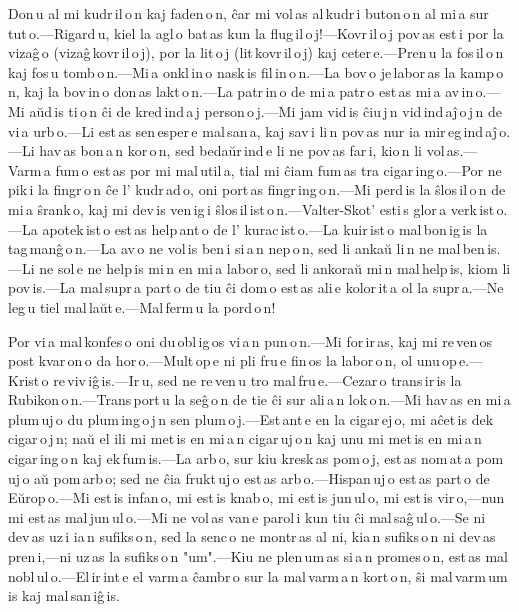 \documentclass[ngerman,12pt,twoside]{book}
\begin{document}

Don\,u al mi kudr\,il\,o\,n kaj faden\,o\,n, ĉar mi vol\,as al\,kudr\,i buton\,o\,n al mi\,a sur\,tut\,o.---Rigard\,u, kiel la agl\,o bat\,as kun la flug\,il\,o\,j!---Kovr\,il\,o\,j pov\,as est\,i por la vizaĝ\,o (vizaĝ\,kovr\,il\,o\,j), por la lit\,o\,j (lit\,kovr\,il\,o\,j) kaj ceter\,e.---Pren\,u la fos\,il\,o\,n kaj fos\,u tomb\,o\,n.---Mi\,a onkl\,in\,o nask\,is fil\,in\,o\,n.---La bov\,o je\,labor\,as la kamp\,o\,n, kaj la bov\,in\,o don\,as lakt\,o\,n.---La patr\,in\,o de mi\,a patr\,o est\,as mi\,a av\,in\,o.---Mi aŭd\,is ti\,o\,n ĉi de kred\,ind\,a\,j person\,o\,j.---Mi jam vid\,is ĉiu\,j\,n vid\,ind\,aĵ\,o\,j\,n de vi\,a urb\,o.---Li est\,as sen\,esper\,e mal\,san\,a, kaj sav\,i li\,n pov\,as nur ia mir\,eg\,ind\,aĵ\,o.---Li hav\,as bon\,a\,n kor\,o\,n, sed bedaŭr\,ind\,e li ne pov\,as far\,i, kio\,n li vol\,as.---Varm\,a fum\,o est\,as por mi mal\,util\,a, tial mi ĉiam fum\,as tra cigar\,ing\,o.---Por ne pik\,i la fingr\,o\,n ĉe l' kudr\,ad\,o, oni port\,as fingr\,ing\,o\,n.---Mi perd\,is la ŝlos\,il\,o\,n de mi\,a ŝrank\,o, kaj mi dev\,is ven\,ig\,i ŝlos\,il\,ist\,o\,n.---Valter-Skot' esti\,s glor\,a verk\,ist\,o.---La apotek\,ist\,o est\,as help\,ant\,o de l' kurac\,ist\,o.---La kuir\,ist\,o mal\,bon\,ig\,is la tag\,manĝ\,o\,n.---La av\,o ne vol\,is ben\,i si\,a\,n nep\,o\,n, sed li ankaŭ li\,n ne mal\,ben\,is.---Li ne sol\,e ne help\,is mi\,n en mi\,a labor\,o, sed li ankoraŭ mi\,n mal\,help\,is, kiom li pov\,is.---La mal\,supr\,a part\,o de tiu ĉi dom\,o est\,as ali\,e kolor\,it\,a ol la supr\,a.---Ne leg\,u tiel mal\,laŭt\,e.---Mal\,ferm\,u la pord\,o\,n! 



Por vi\,a mal\,konfes\,o oni du\,obl\,ig\,os vi\,a\,n pun\,o\,n.---Mi for\,ir\,as, kaj mi re\,ven\,os post kvar\,on\,o da hor\,o.---Mult\,op\,e ni pli fru\,e fin\,os la labor\,o\,n, ol unu\,op\,e.---Krist\,o re\,viv\,iĝ\,is.---Ir\,u, sed ne re\,ven\,u tro mal\,fru\,e.---Cezar\,o trans\,ir\,is la Rubikon\,o\,n.---Trans\,port\,u la seĝ\,o\,n de tie ĉi sur ali\,a\,n lok\,o\,n.---Mi hav\,as en mi\,a plum\,uj\,o du plum\,ing\,o\,j\,n sen plum\,o\,j.---Est\,ant\,e en la cigar\,ej\,o, mi aĉet\,is dek cigar\,o\,j\,n; naŭ el ili mi met\,is en mi\,a\,n cigar\,uj\,o\,n kaj unu mi met\,is en mi\,a\,n cigar\,ing\,o\,n kaj ek\,fum\,is.---La arb\,o, sur kiu kresk\,as pom\,o\,j, est\,as nom\,at\,a pom\,uj\,o aŭ pom\,arb\,o; sed ne ĉia frukt\,uj\,o est\,as arb\,o.---Hispan\,uj\,o est\,as part\,o de Eŭrop\,o.---Mi est\,is infan\,o, mi est\,is knab\,o, mi est\,is jun\,ul\,o, mi est\,is vir\,o,---nun mi est\,as mal\,jun\,ul\,o.---Mi ne vol\,as van\,e parol\,i kun tiu ĉi mal\,saĝ\,ul\,o.---Se ni dev\,as uz\,i ia\,n sufiks\,o\,n, sed la senc\,o ne montr\,as al ni, kia\,n sufiks\,o\,n ni dev\,as pren\,i,---ni uz\,as la sufiks\,o\,n "um".---Kiu ne plen\,um\,as si\,a\,n promes\,o\,n, est\,as mal\,nobl\,ul\,o.---El\,ir\,int\,e el varm\,a ĉambr\,o sur la mal\,varm\,a\,n kort\,o\,n, ŝi mal\,varm\,um\,is kaj mal\,san\,iĝ\,is.
\end{document}
